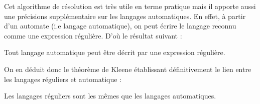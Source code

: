 Cet algorithme de résolution est très utile en terme pratique mais il apporte aussi une précisions supplémentaire sur 
les langages automatiques. En effet, à partir d'un automate (i.e langage automatique), on peut écrire le langage 
reconnu comme une expression régulière. D'où le résultat suivant : 

\begin{prop}
    Tout langage automatique peut être décrit par une expression régulière. 
\end{prop}

On en déduit donc le théorème de Kleene établissant définitivement le lien entre les langages réguliers et automatique : 

\begin{theorem}[Kleene]
    Les langages réguliers sont les mêmes que les langages automatiques. 
\end{theorem}
